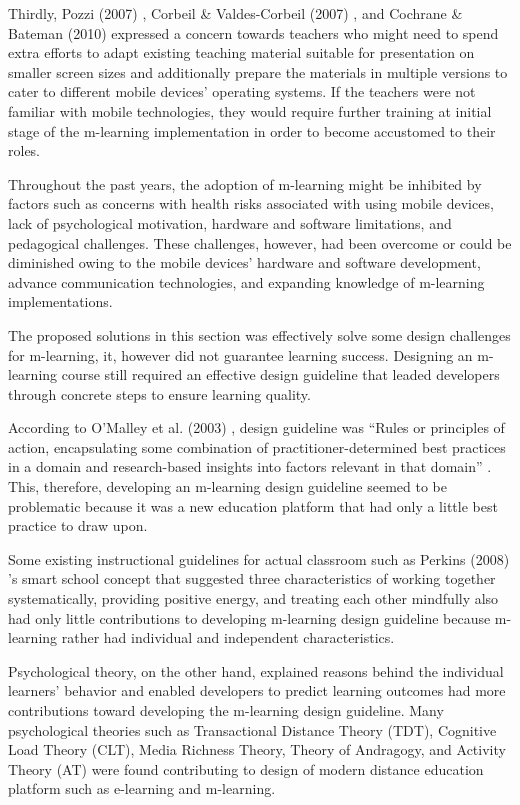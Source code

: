 Thirdly, Pozzi (2007) \cite{pozzi2007impact}, Corbeil \& Valdes-Corbeil (2007) \cite{corbeil2007you}, and Cochrane \& Bateman (2010)\cite{cochrane2010smartphones} expressed a concern towards teachers who might need to spend extra efforts to adapt existing teaching material suitable for presentation on smaller screen sizes and additionally prepare the materials in multiple versions to cater to different mobile devices' operating systems. If the teachers were not familiar with mobile technologies, they would require further training at initial stage of the m-learning implementation in order to become accustomed to their roles. 


Throughout the past years, the adoption of m-learning might be inhibited by factors such as concerns with health risks associated with using mobile devices, lack of psychological motivation, hardware and software limitations, and pedagogical challenges. These challenges, however, had been overcome or could be diminished owing to the mobile devices' hardware and software development, advance communication technologies, and expanding knowledge of m-learning implementations. 

The proposed solutions in this section was effectively solve some design challenges for m-learning, it, however did not guarantee learning success. Designing an m-learning course still required an effective design guideline that leaded developers through concrete steps to ensure learning quality.   

According to O'Malley et al. (2003) \cite{o2003guidelines}, design guideline was ``Rules or principles of action, encapsulating some combination of practitioner-determined best practices in a domain and research-based insights into factors relevant in that domain'' \cite[pp. 7]{o2003guidelines}. This, therefore, developing an m-learning design guideline seemed to be problematic because it was a new education platform that had only a little best practice to draw upon. 

Some existing instructional guidelines for actual classroom such as Perkins (2008) \cite{perkins2008smart}'s smart school concept that suggested three characteristics of working together systematically, providing positive energy, and treating each other mindfully also had only little contributions to developing m-learning design guideline  because m-learning rather had individual and independent characteristics. 

Psychological theory, on the other hand, explained reasons behind the individual learners' behavior and enabled developers to predict learning outcomes had more contributions toward developing the m-learning design guideline. Many psychological theories such as Transactional Distance Theory (TDT), Cognitive Load Theory (CLT), Media Richness Theory, Theory of Andragogy, and Activity Theory (AT) were found contributing to design of modern distance education platform such as e-learning and m-learning. 


